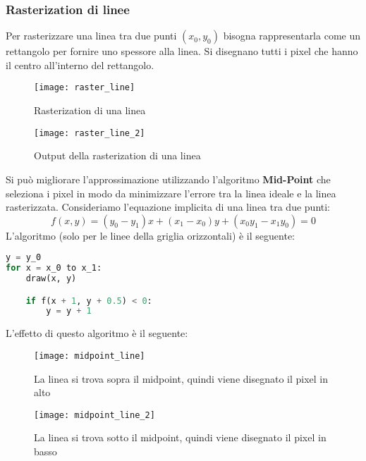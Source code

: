 \documentclass[a4paper]{article}
\begin{document}
\subsubsection{Rasterization di linee}
Per rasterizzare una linea tra due punti \( (x_0, y_0) \) bisogna rappresentarla come
un rettangolo per fornire uno spessore alla linea. Si disegnano tutti i pixel che hanno
il centro all'interno del rettangolo.
\begin{figure}[H]
  \centering
  \begin{minipage}{0.48\textwidth}
     \centering
     \texttt{[image: raster\_line]}
     \caption{Rasterization di una linea}
   \end{minipage}\hfill
   \begin{minipage}{0.48\textwidth}
     \centering
     \texttt{[image: raster\_line\_2]}
     \caption{Output della rasterization di una linea}
   \end{minipage}
\end{figure}
\noindent
Si può migliorare l'approssimazione utilizzando l'algoritmo \textbf{Mid-Point}
che seleziona i pixel in modo da minimizzare l'errore tra la linea ideale e la
linea rasterizzata. Consideriamo l'equazione implicita di una linea tra due punti:
\[
  f(x,y) = (y_0 - y_1)x + (x_1 - x_0)y + (x_0y_1 - x_1y_0) = 0
\] 
L'algoritmo (solo per le linee della griglia orizzontali) è il seguente:
\begin{lstlisting}[language=Python]
y = y_0
for x = x_0 to x_1:
    draw(x, y)

    if f(x + 1, y + 0.5) < 0:
        y = y + 1
\end{lstlisting}
L'effetto di questo algoritmo è il seguente:
\begin{figure}[H]
  \centering
  \begin{minipage}{0.48\textwidth}
     \centering
     \texttt{[image: midpoint\_line]}
     \caption{La linea si trova sopra il midpoint, quindi viene disegnato il pixel in alto}
   \end{minipage}\hfill
   \begin{minipage}{0.48\textwidth}
     \centering
     \texttt{[image: midpoint\_line\_2]}
     \caption{La linea si trova sotto il midpoint, quindi viene disegnato il pixel in basso}
  \end{minipage}
\end{figure}
\end{document}
